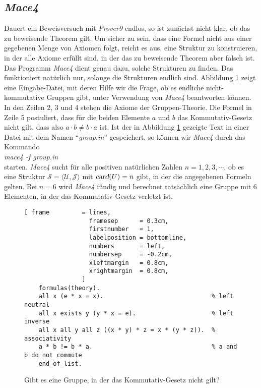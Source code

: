 \subsection{\textsl{Mace4} }
Dauert ein Beweisversuch  mit \textsl{Prover9} endlos, so ist zun\"{a}chst nicht klar, ob das zu beweisende
Theorem gilt.  Um sicher zu sein, 
dass eine Formel nicht aus einer gegebenen Menge von Axiomen folgt, reicht es aus, eine Struktur zu
konstruieren, in der alle Axiome erf\"{u}llt sind, in der das zu beweisende Theorem aber falsch ist.
Das Programm \textsl{Mace4} dient genau dazu, solche Strukturen zu finden.  Das funktioniert nat\"{u}rlich nur,
solange die Strukturen endlich sind.  Abbildung \ref{fig:group.in} zeigt eine Eingabe-Datei, mit deren Hilfe
wir die Frage, ob es endliche nicht-kommutative Gruppen gibt, unter Verwendung von \textsl{Mace4} beantworten
k\"{o}nnen.  In den Zeilen 2, 3 und 4 stehen die Axiome der Gruppen-Theorie.  Die Formel in Zeile 5 postuliert,
dass f\"{u}r die beiden Elemente $a$ und $b$ das Kommutativ-Gesetz nicht gilt, dass also $a \cdot b \not= b \cdot
a$ ist.  Ist der in 
Abbildung \ref{fig:group.in} gezeigte Text in einer Datei mit dem Namen ``\textsl{group.in}'' gespeichert, so
k\"{o}nnen wir \textsl{Mace4} durch das Kommando
\\[0.2cm]
\hspace*{1.3cm}
\textsl{mace4 -f group.in}
\\[0.2cm]
starten.  \textsl{Mace4} sucht f\"{u}r alle positiven nat\"{u}rlichen  Zahlen $n=1,2,3,\cdots$, ob es eine Struktur 
$\mathcal{S} = \langle \mathcal{U}, \mathcal{J} \rangle$ mit $\textsl{card}(U) = n$ gibt, in der die
angegebenen Formeln gelten.  Bei $n=6$ wird \textsl{Mace4} f\"{u}ndig und berechnet tats\"{a}chlich eine Gruppe mit 6
Elementen, in der das Kommutativ-Gesetz verletzt ist.

\begin{figure}[!ht]
\centering
\begin{Verbatim}[ frame         = lines, 
                  framesep      = 0.3cm, 
                  firstnumber   = 1,
                  labelposition = bottomline,
                  numbers       = left,
                  numbersep     = -0.2cm,
                  xleftmargin   = 0.8cm,
                  xrightmargin  = 0.8cm,
                ]
    formulas(theory).
    all x (e * x = x).                              % left neutral
    all x exists y (y * x = e).                     % left inverse
    all x all y all z ((x * y) * z = x * (y * z)).  % associativity
    a * b != b * a.                                 % a and b do not commute
    end_of_list.
\end{Verbatim}
\vspace*{-0.3cm}
\caption{Gibt es eine Gruppe, in der das Kommutativ-Gesetz nicht gilt?}
\label{fig:group.in}
\end{figure}


